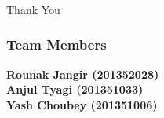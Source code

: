 \documentclass{beamer}
\begin{document}

\begin{frame}
\frametitle{}
\begin{center}
\large{Thank You}
\end{center}
\end{frame}


\begin{frame}
\frametitle{Team Members}
\center
\textbf{Rounak Jangir (201352028)}\\
\textbf{Anjul Tyagi (201351033)}\\
\textbf{Yash Choubey (201351006)}

\end{frame}
\end{document}
